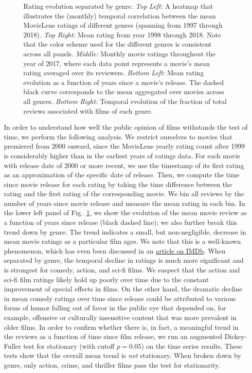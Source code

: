 \documentclass[dvipsnames]{article}
\begin{document}
\begin{figure}
    \caption{Rating evolution separated by genre. {\it Top Left:} A heatmap that illustrates the (monthly) temporal correlation between the mean MovieLens ratings of different genres (spanning from 1997 through 2018). {\it Top Right:} Mean rating from year 1998 through 2018. Note that the color scheme used for the different genres is consistent across all panels. {\it Middle:} Monthly movie ratings throughout the year of 2017, where each data point represents a movie's mean rating averaged over its reviewers. {\it Bottom Left:} Mean rating evolution as a function of years since a movie's release. The dashed black curve corresponds to the mean aggregated over movies across all genres. {\it Bottom Right:} Temporal evolution of the fraction of total reviews associated with films of each genre.}
    \label{fig:eda2}
\end{figure}

In order to understand how well the public opinion of films withstands the test of time, we perform the following analysis. We restrict ourselves to movies that premiered from 2000 onward, since the MovieLens yearly rating count after 1999 is considerably higher than in the earliest years of ratings data. For each movie with release date of 2000 or more recent, we use the timestamp of its first rating as an approximation of the specific date of release. Then, we compute the time since movie release for each rating by taking the time difference between the rating and the first rating of the corresponding movie. We bin all reviews by the number of years since movie release and measure the mean rating in each bin. In the lower left panel of Fig.~\ref{fig:eda2}, we show the evolution of the mean movie review as a function of years since release (black dashed line); we also further break this trend down by genre. The trend indicates a small, but non-negligible, decrease in mean movie ratings as a particular film ages. We note that this is a well-known phenomenon, which has even been discussed in an \href{https://help.imdb.com/article/imdb/track-movies-tv/why-do-the-user-ratings-on-many-movies-and-tv-shows-seem-to-decrease-over-time/G4SK7DG5EA35B4GF}{article on IMDb}. When separated by genre, the temporal decline in ratings is much more significant and is strongest for comedy, action, and sci-fi films. We suspect that the action and sci-fi film ratings likely hold up poorly over time due to the constant improvement of special effects in films. On the other hand, the dramatic decline in mean comedy ratings over time since release could be attributed to various forms of humor falling out of favor in the public eye that depended on, for example, offensive or culturally insensitive content that was more prevalent in older films. In order to confirm whether there is, in fact, a meaningful trend in the reviews as a function of time since film release, we run an augmented Dickey-Fuller test for stationary (with cutoff $p=0.05$) on the time series results. These tests show that the overall mean trend is \textit{not} stationary. When broken down by genre, only action, crime, and thriller films pass the test for stationarity.
\end{document}
